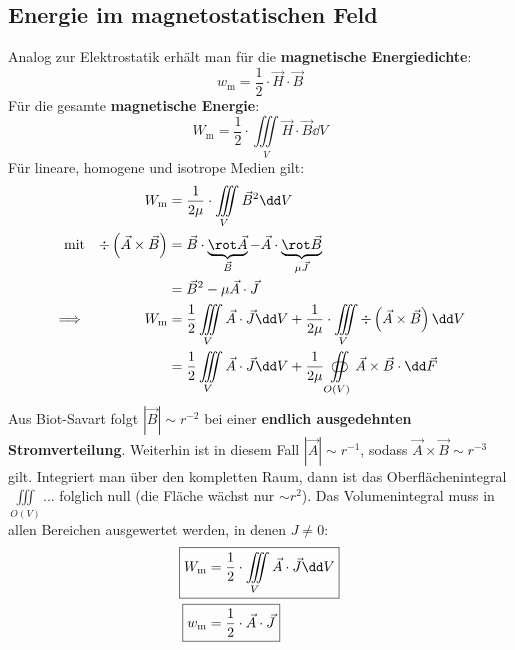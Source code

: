   \subsection{Energie im magnetostatischen Feld}
		   Analog zur Elektrostatik erhält man für die \textbf{magnetische Energiedichte}:
		        \begin{equation}\label{edichteH}
			        \boxed{  w _\mathrm{m} = \dfrac{1}{2} \cdot \vec{H}  \cdot \vec{B} }
		        \end{equation}
		   Für die gesamte \textbf{magnetische Energie}:
		        \begin{equation}
			        \boxed{ W _\mathrm{m} = \dfrac{1}{2} \cdot \iiint\limits_{V} \vec{H}  \cdot \vec{B}  \dd V}
		        \end{equation}
		    Für lineare, homogene und isotrope Medien gilt:
		        \begin{align*}
			       & & W _\mathrm{m} &= \dfrac{1}{2 \mu} \cdot \iiint\limits_{V} \vec{B} ^2 \dd V\\
				        \text{mit}&& \div \left(  \vec{A} \times \vec{B}  \right) &= \vec{B}  \cdot \underbrace{\rot  \vec{A}}_{\vec{B} } -  \vec{A} \cdot \underbrace{\rot \vec{B} }_{\mu \vec{J}} \\
				        &&&= \vec{B} ^2 - \mu   \vec{A} \cdot \vec{J}\\
			       				      \implies&&  W _\mathrm{m} &= \dfrac{1}{2}  \iiint\limits_{V}  \vec{A} \cdot \vec{J} \dd V + \dfrac{1}{2 \mu} \cdot \iiint\limits_{V} \div \left(  \vec{A} \times \vec{B}  \right) \dd V\\
				       && &= \dfrac{1}{2}\iiint\limits_{V}  \vec{A} \cdot \vec{J} \dd V + \dfrac{1}{2 \mu} \oiint\limits_{O(V)}  \vec{A} \times \vec{B}  \cdot \dd\vec{F}
			        \end{align*}
		    Aus Biot-Savart folgt \(\left| \vec{B}  \right| \sim r^{-2} \) bei einer \textbf{endlich ausgedehnten Stromverteilung}.  Weiterhin ist in diesem Fall \(\left|  \vec{A} \right| \sim r^{-1} \), sodass \( \vec{A} \times \vec{B}  \sim r^{-3} \) gilt. Integriert man über den kompletten Raum, dann ist das Oberflächenintegral $\iiint\limits_{O(V)}...$ folglich null (die Fläche wächst nur $\sim r^2$). Das Volumenintegral muss in allen Bereichen ausgewertet werden, in denen $J\neq 0$:
		        \begin{equation}\begin{split}
				          \Aboxed{W _\mathrm{m}& = \dfrac{1}{2} \cdot \iiint\limits_{V}  \vec{A} \cdot \vec{J} \dd V}\\
				          \Aboxed{ w _\mathrm{m}& = \dfrac{1}{2} \cdot  \vec{A} \cdot \vec{J} }
			        \end{split}\end{equation}
